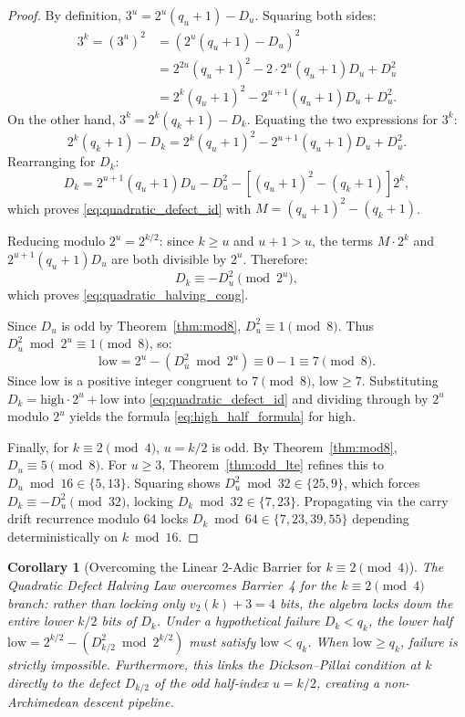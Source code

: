 \documentclass[11pt,reqno]{amsart}
\newtheorem{corollary}[theorem]{Corollary}
\theoremstyle{definition}
\numberwithin{equation}{section}
\begin{document}
\begin{proof}
By definition, $3^u = 2^u (q_u + 1) - D_u$. Squaring both sides:
\begin{align*}
3^k = (3^u)^2 &= \left( 2^u (q_u + 1) - D_u \right)^2 \\
&= 2^{2u}(q_u + 1)^2 - 2 \cdot 2^u(q_u + 1) D_u + D_u^2 \\
&= 2^k(q_u + 1)^2 - 2^{u+1}(q_u + 1) D_u + D_u^2.
\end{align*}
On the other hand, $3^k = 2^k(q_k + 1) - D_k$. Equating the two expressions for $3^k$:
\[
2^k(q_k + 1) - D_k = 2^k(q_u + 1)^2 - 2^{u+1}(q_u + 1) D_u + D_u^2.
\]
Rearranging for $D_k$:
\[
D_k = 2^{u+1}(q_u + 1) D_u - D_u^2 - \left[ (q_u + 1)^2 - (q_k + 1) \right] 2^k,
\]
which proves \eqref{eq:quadratic_defect_id} with $M = (q_u + 1)^2 - (q_k + 1)$.

Reducing modulo $2^u = 2^{k/2}$: since $k \ge u$ and $u + 1 > u$, the terms $M \cdot 2^k$ and $2^{u+1}(q_u + 1) D_u$ are both divisible by $2^u$. Therefore:
\[
D_k \equiv -D_u^2 \pmod{2^u},
\]
which proves \eqref{eq:quadratic_halving_cong}.

Since $D_u$ is odd by Theorem~\ref{thm:mod8}, $D_u^2 \equiv 1 \pmod 8$. Thus $D_u^2 \bmod 2^u \equiv 1 \pmod 8$, so:
\[
\mathrm{low} = 2^u - (D_u^2 \bmod 2^u) \equiv 0 - 1 \equiv 7 \pmod 8.
\]
Since $\mathrm{low}$ is a positive integer congruent to $7 \pmod 8$, $\mathrm{low} \ge 7$.
Substituting $D_k = \mathrm{high} \cdot 2^u + \mathrm{low}$ into \eqref{eq:quadratic_defect_id} and dividing through by $2^u$ modulo $2^u$ yields the formula \eqref{eq:high_half_formula} for $\mathrm{high}$.

Finally, for $k \equiv 2 \pmod 4$, $u = k/2$ is odd. By Theorem~\ref{thm:mod8}, $D_u \equiv 5 \pmod 8$. For $u \ge 3$, Theorem~\ref{thm:odd_lte} refines this to $D_u \bmod 16 \in \{5, 13\}$. Squaring shows $D_u^2 \bmod 32 \in \{25, 9\}$, which forces $D_k \equiv -D_u^2 \pmod{32}$, locking $D_k \bmod 32 \in \{7, 23\}$. Propagating via the carry drift recurrence modulo 64 locks $D_k \bmod 64 \in \{7, 23, 39, 55\}$ depending deterministically on $k \bmod 16$. \qedhere
\end{proof}

\begin{corollary}[Overcoming the Linear 2-Adic Barrier for $k \equiv 2 \pmod 4$]\label{cor:quadratic_barrier}
The Quadratic Defect Halving Law overcomes Barrier~4 for the $k \equiv 2 \pmod 4$ branch:
rather than locking only $v_2(k) + 3 = 4$ bits, the algebra locks down the entire lower $k/2$ bits of $D_k$.
Under a hypothetical failure $D_k < q_k$, the lower half $\mathrm{low} = 2^{k/2} - (D_{k/2}^2 \bmod 2^{k/2})$ must satisfy $\mathrm{low} < q_k$.
When $\mathrm{low} \ge q_k$, failure is strictly impossible.
Furthermore, this links the Dickson--Pillai condition at $k$ directly to the defect $D_{k/2}$ of the odd half-index $u = k/2$, creating a non-Archimedean descent pipeline.
\end{corollary}
\end{document}
